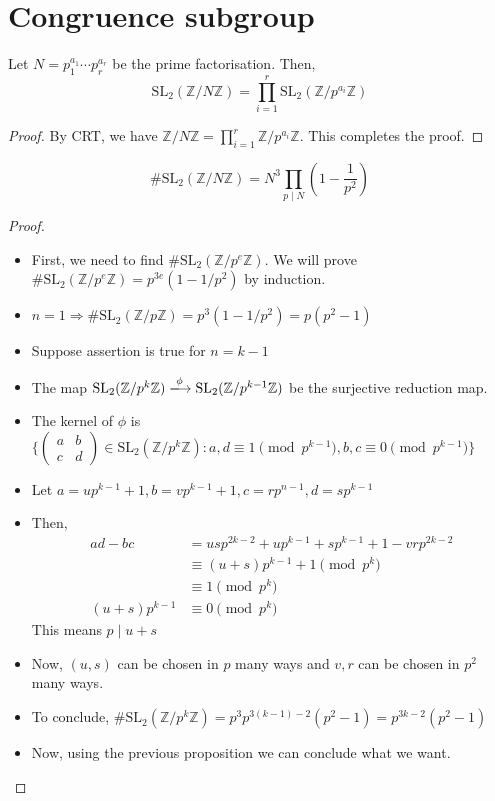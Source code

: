 \documentclass[oneside, 12pt]{scrbook}
\newcommand{\ZZ}{\mathbb Z}
\newcommand{\SL}{\mathrm{SL}}
\theoremstyle{theorem}
\begin{document}
\section{Congruence subgroup}

\begin{proposition}
Let $N=p_{1}^{a_{1}}\cdots p_{r}^{a_{r}}$ be the prime factorisation. Then, $$\mathrm{SL}_{2} (\ZZ / N \ZZ) = \prod_{i=1}^{r} \mathrm{SL}_{2}(\ZZ / p^{a_{i}} \ZZ) $$ 
\end{proposition}

\begin{proof}
By CRT, we have $\ZZ/N\ZZ = \prod_{i=1}^{r} \ZZ/p^{a_{i}}\ZZ$. This completes the proof. 
\end{proof}

\begin{lemma}[DS, Exercise 1.2.3]
$$\# \mathrm{SL}_{2}(\ZZ / N \ZZ) = N^3 \prod_{p \mid N} \left( 1 - \frac{1}{p^2} \right)$$
\end{lemma}

\begin{proof}
\begin{itemize}
\item First, we need to find $\#\SL_{2}(\ZZ/p^e \ZZ)$. We will prove $\#\SL_{2}(\ZZ/p^e \ZZ) = p^{3e}(1-1/p^2)$ by induction.
\item $n=1 \Rightarrow \#\SL_{2}(\ZZ/p\ZZ) = p^3(1-1/p^2) = p(p^2-1)$
\item Suppose assertion is true for $n=k-1$
\item The map $\SL_{2}(\ZZ/p^k \ZZ) \xlongrightarrow{\phi} \SL_{2}(\ZZ/p^{k-1}\ZZ)$ be the surjective reduction map. 
\item The kernel of $\phi$ is $\{\begin{pmatrix}
a & b \\ c&d
\end{pmatrix}\in \SL_{2}(\ZZ/p^{k}\ZZ) : a,d \equiv 1 \pmod{p^{k-1}}, b,c \equiv 0 \pmod{p^{k-1}} \}$
\item Let $a =up^{k-1} + 1 , b = vp^{k-1} + 1 , c = rp^{n-1}, d=sp^{k-1}$
\item Then,
\begin{align*}
ad-bc &= usp^{2k-2} + up^{k-1} + sp^{k-1} + 1 - vrp^{2k-2} \\
&\equiv (u+s)p^{k-1} + 1 \pmod{p^k}\\
&\equiv 1 \pmod{p^k}\\
(u+s)p^{k-1} &\equiv 0 \pmod{p^{k}}
\end{align*}
This means $p \mid u+s$
\item Now, $(u,s)$ can be chosen in $p$ many ways and $v,r$ can be chosen in $p^2$ many ways.
\item To conclude, $\#\SL_{2}(\ZZ/p^k \ZZ) = p^3 p^{3(k-1)-2} (p^2 -1) = p^{3k-2}(p^2 -1)$
\item Now, using the previous proposition we can conclude what we want.
\end{itemize}
\end{proof}
\end{document}
